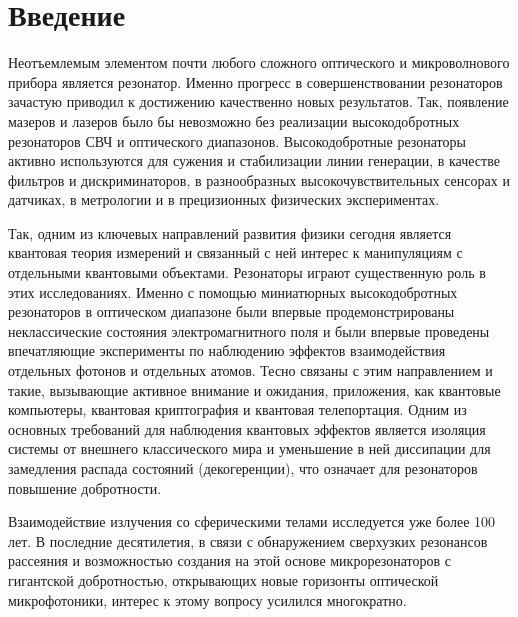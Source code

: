 \documentclass[12pt,a4paper]{article}
\begin{document}
    

    \tableofcontents

    \newpage


    \section*{Введение}

        Неотъемлемым элементом почти любого сложного оптического и микроволнового прибора является резонатор. Именно прогресс в совершенствовании резонаторов зачастую приводил к достижению качественно новых результатов. Так, появление мазеров и лазеров было бы невозможно без реализации высокодобротных резонаторов СВЧ и оптического диапазонов. Высокодобротные резонаторы активно используются для сужения и стабилизации линии генерации, в качестве фильтров и дискриминаторов, в разнообразных высокочувствительных сенсорах и датчиках, в метрологии и в прецизионных физических экспериментах. \cite{microresonators}

        Так, одним из ключевых направлений развития физики сегодня является квантовая теория измерений и связанный с ней интерес к манипуляциям с отдельными квантовыми объектами. Резонаторы играют существенную роль в этих исследованиях. Именно с помощью миниатюрных высокодобротных резонаторов в оптическом диапазоне были впервые продемонстрированы неклассические состояния электромагнитного поля и были впервые проведены впечатляющие эксперименты по наблюдению эффектов взаимодействия отдельных фотонов и отдельных атомов. Тесно связаны с этим направлением и такие, вызывающие активное внимание и ожидания, приложения, как квантовые компьютеры, квантовая криптография и квантовая телепортация. Одним из основных требований для наблюдения квантовых эффектов является изоляция системы от внешнего классического мира и уменьшение в ней диссипации для замедления распада состояний (декогеренции), что означает для резонаторов повышение добротности. \cite{microresonators}

        Взаимодействие излучения со сферическими телами исследуется уже более 100 лет. В последние десятилетия, в связи с обнаружением сверхузких резонансов рассеяния и возможностью создания на этой основе микрорезонаторов с гигантской добротностью, открывающих новые горизонты оптической микрофотоники, интерес к этому вопросу усилился многократно. \cite{microresonators}
\end{document}
